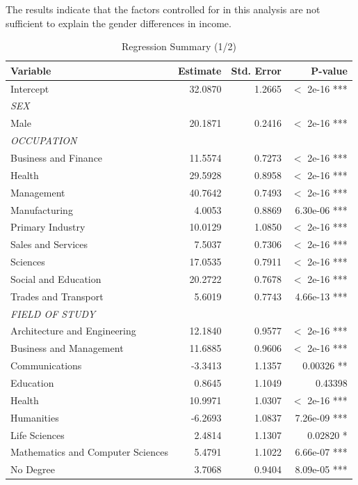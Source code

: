 \documentclass[12pt]{article}
\begin{document}
The results indicate that the factors controlled for in this analysis are not sufficient to explain the gender differences in income.

\begin{table}[ht]
\centering
\caption{Regression Summary (1/2)}
\label{tab:regression-result1of2}
\small
\begin{tabular}{@{}lrrr@{}}
\toprule
\textbf{Variable} & \textbf{Estimate} & \textbf{Std. Error} & \textbf{P-value} \\ \midrule
Intercept & 32.0870 & 1.2665 & $<$ 2e-16 *** \\
\textit{SEX} & & & \\
\quad Male & 20.1871 & 0.2416 & $<$ 2e-16 *** \\
\textit{OCCUPATION} & & & \\
\quad Business and Finance & 11.5574 & 0.7273 & $<$ 2e-16 *** \\
\quad Health & 29.5928 & 0.8958 & $<$ 2e-16 *** \\
\quad Management & 40.7642 & 0.7493 & $<$ 2e-16 *** \\
\quad Manufacturing & 4.0053 & 0.8869 & 6.30e-06 *** \\
\quad Primary Industry & 10.0129 & 1.0850 & $<$ 2e-16 *** \\
\quad Sales and Services & 7.5037 & 0.7306 & $<$ 2e-16 *** \\
\quad Sciences & 17.0535 & 0.7911 & $<$ 2e-16 *** \\
\quad Social and Education & 20.2722 & 0.7678 & $<$ 2e-16 *** \\
\quad Trades and Transport & 5.6019 & 0.7743 & 4.66e-13 *** \\
\textit{FIELD OF STUDY} & & & \\
\quad Architecture and Engineering & 12.1840 & 0.9577 & $<$ 2e-16 *** \\
\quad Business and Management & 11.6885 & 0.9606 & $<$ 2e-16 *** \\
\quad Communications & -3.3413 & 1.1357 & 0.00326 ** \\
\quad Education & 0.8645 & 1.1049 & 0.43398 \\
\quad Health & 10.9971 & 1.0307 & $<$ 2e-16 *** \\
\quad Humanities & -6.2693 & 1.0837 & 7.26e-09 *** \\
\quad Life Sciences & 2.4814 & 1.1307 & 0.02820 * \\
\quad Mathematics and Computer Sciences & 5.4791 & 1.1022 & 6.66e-07 *** \\
\quad No Degree & 3.7068 & 0.9404 & 8.09e-05 *** \\

\end{tabular}
\end{table}
\end{document}
